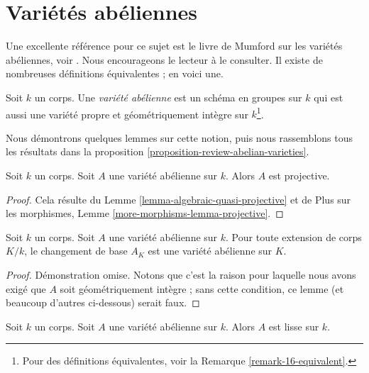 \section{Variétés abéliennes}
\label{section-abelian-varieties}

\noindent
Une excellente référence pour ce sujet est le livre de Mumford sur les
variétés abéliennes, voir \cite{AVar}. Nous encourageons le lecteur à
le consulter. Il existe de nombreuses définitions équivalentes ; en voici une.

\begin{definition}
\label{definition-abelian-variety}
Soit $k$ un corps. Une {\it variété abélienne} est un schéma en groupes sur
$k$ qui est aussi une variété propre et géométriquement intègre sur
$k$\footnote{Pour des définitions équivalentes, voir la Remarque \ref{remark-16-equivalent}.}.
\end{definition}

\noindent
Nous démontrons quelques lemmes sur cette notion, puis nous rassemblons
tous les résultats dans la
proposition \ref{proposition-review-abelian-varieties}.

\begin{lemma}
\label{lemma-abelian-variety-projective}
Soit $k$ un corps. Soit $A$ une variété abélienne sur $k$.
Alors $A$ est projective.
\end{lemma}

\begin{proof}
Cela résulte du
Lemme \ref{lemma-algebraic-quasi-projective} et de
Plus sur les morphismes, Lemme \ref{more-morphisms-lemma-projective}.
\end{proof}

\begin{lemma}
\label{lemma-abelian-variety-change-field}
Soit $k$ un corps. Soit $A$ une variété abélienne sur $k$.
Pour toute extension de corps $K/k$, le changement de base $A_K$ est une
variété abélienne sur $K$.
\end{lemma}

\begin{proof}
Démonstration omise. Notons que c'est la raison pour laquelle nous avons exigé que $A$ soit
géométriquement intègre ; sans cette condition, ce lemme
(et beaucoup d'autres ci-dessous) serait faux.
\end{proof}

\begin{lemma}
\label{lemma-abelian-variety-smooth}
Soit $k$ un corps. Soit $A$ une variété abélienne sur $k$.
Alors $A$ est lisse sur $k$.
\end{lemma}

